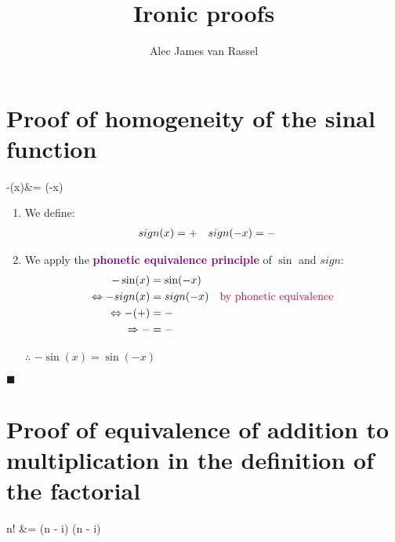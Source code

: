 \documentclass[12pt, titlepage,french]{article}
\begin{document}
\title{Ironic proofs}
\vspace{-8ex}
\date{}
\author{Alec James van Rassel}
\maketitle

\tableofcontents
\setcounter{secnumdepth}{-1}

\clearpage

\section{Proof of homogeneity of the sinal function}

\begin{theorems}[Theorem]
	-\sin(x)&=	\sin(-x) 
\end{theorems}

\begin{distributions}[Proof]
\begin{enumerate}
	\item	We define:
		\begin{align*}
		sign(x)	&=	\textcolor{blue}{+}	&
		sign(-x)	&=	\textcolor{red}{-}
		\end{align*}
	\item	We apply the \textcolor{purple}{\textbf{phonetic equivalence principle}} of $\sin$ and $sign$:
		\begin{align*}
						-\sin(x)					&=	\sin(-x)	\\		
		\Leftrightarrow	-sign(x)					&=	sign(-x)		\quad	\text{\textcolor{purple}{by phonetic equivalence}}\\		
		\Leftrightarrow	-(\textcolor{blue}{+})	&=	\textcolor{red}{-}	\\		
		\Rightarrow	\textcolor{red}{-}		&=	\textcolor{red}{-}	
		\end{align*}		
	\item[$\therefore$]	$-\sin(x)=	\sin(-x)$
\end{enumerate}
\end{distributions}
$\blacksquare$

\clearpage

\section{Proof of equivalence of addition to multiplication in the definition of the factorial}

\begin{theorems}[Theorem]
	n!	
	&=	 (n - i)	
	\Leftrightarrow		{} (n - i)	
\end{theorems}
\end{document}
